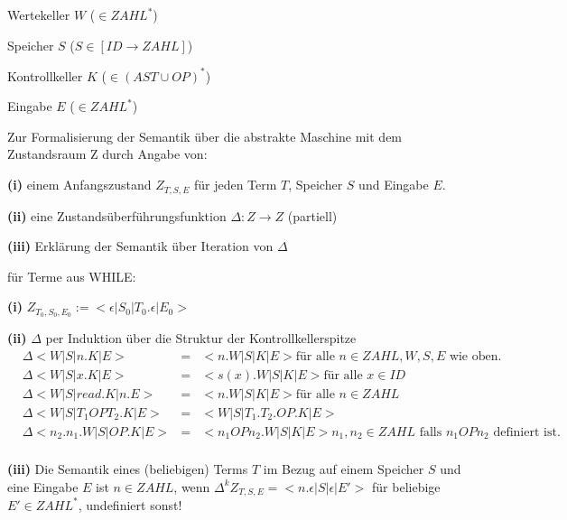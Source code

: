 \begin{compactitem}
\begin{compactitem}
			\begin{compactitem}
				\item Wertekeller $W$ ($\in ZAHL^*$)
				\item Speicher $S$ ($S \in [ID \rightarrow ZAHL]$)
				\item Kontrollkeller $K$ ($ \in (AST \cup OP)^*$)
				\item Eingabe $E$ ($\in ZAHL^*$)
			\end{compactitem}
	\end{compactitem}
		Zur Formalisierung der Semantik über die abstrakte Maschine mit dem Zustandsraum Z durch Angabe von:
		\begin{compactitem}
			\item[\textbf{(i)}] einem Anfangszustand $Z_{T,S,E}$ für jeden Term $T$, Speicher $S$ und Eingabe $E$.
			\item[\textbf{(ii)}] eine Zustandsüberführungsfunktion $\Delta : Z \rightarrow Z$ (partiell)
			\item[\textbf{(iii)}] Erklärung der Semantik über Iteration von $\Delta$\\		
		\end{compactitem}
		für Terme aus WHILE:
			\begin{compactitem}
				\item[\textbf{(i)}]	$Z_{T_0,S_0,E_0} := <\epsilon|S_0|T_0.\epsilon|E_0>$
				\item[\textbf{(ii)}] $\Delta$ per Induktion über die Struktur der Kontrollkellerspitze\\
					\begin{align*}
						&\Delta <W|S|n.K|E> &= &<n.W|S|K|E> \text{für alle } n \in ZAHL, W,S,E \text{ wie oben.}\\
						&\Delta <W|S|x.K|E> &= &<s(x).W|S|K|E> \text{für alle } x \in ID\\
						&\Delta <W|S|read.K|n.E> &= &<n.W|S|K|E> \text{für alle } n \in ZAHL\\
						&\Delta <W|S|T_1 OP T_2.K|E> &= &<W|S|T_1.T_2.OP.K|E> \\
						&\Delta <n_2.n_1.W|S|OP.K|E> &= &<n_1 OP n_2.W|S|K|E> n_1, n_2 \in ZAHL \text{ falls } n_1 OP n_2 \text{ definiert ist.}\\
					\end{align*}
				\item[\textbf{(iii)}] Die Semantik eines (beliebigen) Terms $T$ im Bezug auf einem Speicher $S$ und eine Eingabe $E$ ist $n \in ZAHL$, wenn $\Delta^k Z_{T,S,E} = <n.\epsilon|S|\epsilon|E'>$ für beliebige $E' \in ZAHL^*$, undefiniert sonst!\\ 		
			\end{compactitem}		
\end{compactitem}

